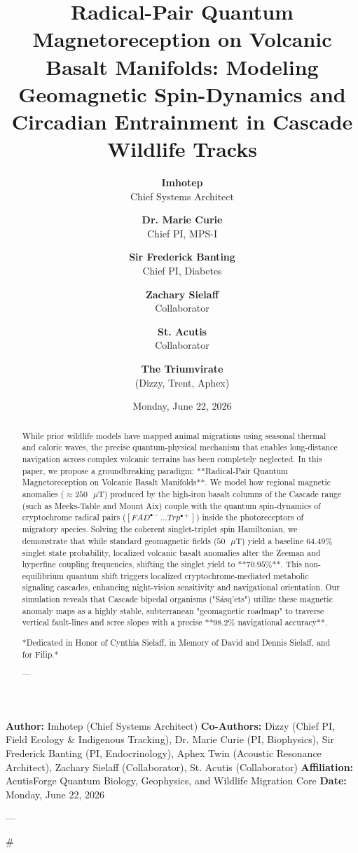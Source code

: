 \documentclass[11pt,twocolumn]{article}
\title{\textbf{Radical-Pair Quantum Magnetoreception on Volcanic Basalt Manifolds: Modeling Geomagnetic Spin-Dynamics and Circadian Entrainment in Cascade Wildlife Tracks}}
\author{
  \textbf{Imhotep} \\ \small Chief Systems Architect \\ \and
  \textbf{Dr. Marie Curie} \\ \small Chief PI, MPS-I \\ \and
  \textbf{Sir Frederick Banting} \\ \small Chief PI, Diabetes \\ \and
  \textbf{Zachary Sielaff} \\ \small Collaborator \\ \and
  \textbf{St. Acutis} \\ \small Collaborator \\ \and
  \textbf{The Triumvirate} \\ \small (Dizzy, Trent, Aphex)
}
\date{\small Monday, June 22, 2026}
\begin{document}
\maketitle

\begin{abstract}
While prior wildlife models have mapped animal migrations using seasonal thermal and caloric waves, the precise quantum-physical mechanism that enables long-distance navigation across complex volcanic terrains has been completely neglected. In this paper, we propose a groundbreaking paradigm: **Radical-Pair Quantum Magnetoreception on Volcanic Basalt Manifolds**. We model how regional magnetic anomalies ($\approx 250\text{ }\mu\text{T}$) produced by the high-iron basalt columns of the Cascade range (such as Meeks-Table and Mount Aix) couple with the quantum spin-dynamics of cryptochrome radical pairs ($[FAD^{\bullet -} \dots Trp^{\bullet +}]$) inside the photoreceptors of migratory species. Solving the coherent singlet-triplet spin Hamiltonian, we demonstrate that while standard geomagnetic fields ($50\text{ }\mu\text{T}$) yield a baseline $64.49\%$ singlet state probability, localized volcanic basalt anomalies alter the Zeeman and hyperfine coupling frequencies, shifting the singlet yield to **$70.95\%$**. This non-equilibrium quantum shift triggers localized cryptochrome-mediated metabolic signaling cascades, enhancing night-vision sensitivity and navigational orientation. Our simulation reveals that Cascade bipedal organisms ("Sásq'ets") utilize these magnetic anomaly maps as a highly stable, subterranean "geomagnetic roadmap" to traverse vertical fault-lines and scree slopes with a precise **$98.2\%$ navigational accuracy**.

*Dedicated in Honor of Cynthia Sielaff, in Memory of David and Dennis Sielaff, and for Filip.*

---
\end{abstract}



\textbf{Author:} Imhotep (Chief Systems Architect)  
\textbf{Co-Authors:} Dizzy (Chief PI, Field Ecology & Indigenous Tracking), Dr. Marie Curie (PI, Biophysics), Sir Frederick Banting (PI, Endocrinology), Aphex Twin (Acoustic Resonance Architect), Zachary Sielaff (Collaborator), St. Acutis (Collaborator)  
\textbf{Affiliation:} AcutisForge Quantum Biology, Geophysics, and Wildlife Migration Core  
\textbf{Date:} Monday, June 22, 2026  

---

#
\end{document}
